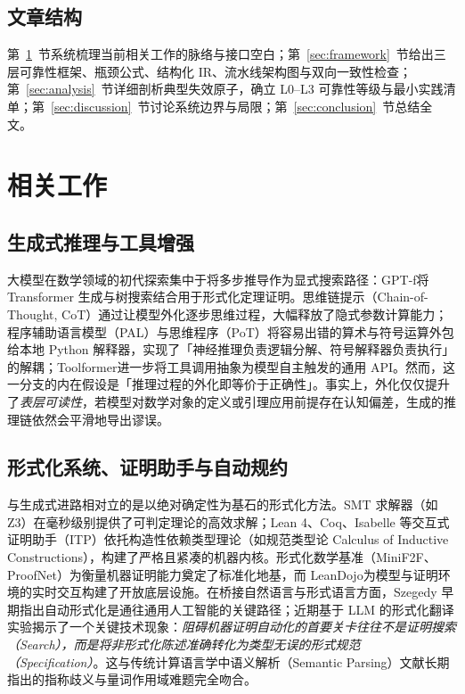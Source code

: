 ﻿\documentclass[UTF8,a4paper,11pt]{ctexart}
\theoremstyle{definition}
\begin{document}
\subsection{文章结构}
第~\ref{sec:related}~节系统梳理当前相关工作的脉络与接口空白；第~\ref{sec:framework}~节给出三层可靠性框架、瓶颈公式、结构化 IR、流水线架构图与双向一致性检查；第~\ref{sec:analysis}~节详细剖析典型失效原子，确立 L0--L3 可靠性等级与最小实践清单；第~\ref{sec:discussion}~节讨论系统边界与局限；第~\ref{sec:conclusion}~节总结全文。

\section{相关工作}
\label{sec:related}

\subsection{生成式推理与工具增强}
大模型在数学领域的初代探索集中于将多步推导作为显式搜索路径：GPT-f\cite{polu2020}将 Transformer 生成与树搜索结合用于形式化定理证明。思维链提示（Chain-of-Thought, CoT）\cite{wei2022cot}通过让模型外化逐步思维过程，大幅释放了隐式参数计算能力；程序辅助语言模型（PAL）\cite{gao2022pal}与思维程序（PoT）\cite{chen2022pot}将容易出错的算术与符号运算外包给本地 Python 解释器，实现了「神经推理负责逻辑分解、符号解释器负责执行」的解耦；Toolformer\cite{schick2023toolformer}进一步将工具调用抽象为模型自主触发的通用 API。然而，这一分支的内在假设是「推理过程的外化即等价于正确性」。事实上，外化仅仅提升了\emph{表层可读性}，若模型对数学对象的定义或引理应用前提存在认知偏差，生成的推理链依然会平滑地导出谬误。

\subsection{形式化系统、证明助手与自动规约}
与生成式进路相对立的是以绝对确定性为基石的形式化方法。SMT 求解器（如 Z3\cite{demoura2008z3}）在毫秒级别提供了可判定理论的高效求解；Lean 4\cite{demoura2021lean4}、Coq、Isabelle 等交互式证明助手（ITP）依托构造性依赖类型理论（如规范类型论 Calculus of Inductive Constructions），构建了严格且紧凑的机器内核。形式化数学基准（MiniF2F\cite{zheng2021minif2f}、ProofNet\cite{azerbayev2023proofnet}）为衡量机器证明能力奠定了标准化地基，而 LeanDojo\cite{yang2023leandojo}为模型与证明环境的实时交互构建了开放底层设施。在桥接自然语言与形式语言方面，Szegedy 早期指出自动形式化是通往通用人工智能的关键路径\cite{szegedy2020}；近期基于 LLM 的形式化翻译实验\cite{wu2022auto,cunningham2022,xin2024deepseekprover}揭示了一个关键技术现象：\emph{阻碍机器证明自动化的首要关卡往往不是证明搜索（Search），而是将非形式化陈述准确转化为类型无误的形式规范（Specification）}。这与传统计算语言学中语义解析（Semantic Parsing）文献长期指出的指称歧义与量词作用域难题完全吻合\cite{kamath2019semparse}。
\end{document}

